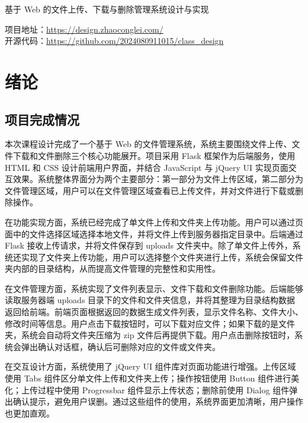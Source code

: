 \documentclass[UTF8,zihao=-4]{ctexrep}
\begin{document}


\begin{center}
    {\heiti{} 基于 Web 的文件上传、下载与删除管理系统设计与实现}

    \vspace{1cm}
    {
        项目地址：\href{https://design.zhaoconglei.com/}{https://design.zhaoconglei.com/} \\
        开源代码：\href{https://github.com/2024080911015/class\_design}{https://github.com/2024080911015/class\_design}
    }
\end{center}

\newpage

\tableofcontents
\newpage

\chapter{绪论}

\section{项目完成情况}

本次课程设计完成了一个基于 Web 的文件管理系统，系统主要围绕文件上传、文件下载和文件删除三个核心功能展开。项目采用 Flask 框架作为后端服务，使用 HTML 和 CSS 设计前端用户界面，并结合 JavaScript 与 jQuery UI 实现页面交互效果。系统整体界面分为两个主要部分：第一部分为文件上传区域，第二部分为文件管理区域，用户可以在文件管理区域查看已上传文件，并对文件进行下载或删除操作。

在功能实现方面，系统已经完成了单文件上传和文件夹上传功能。用户可以通过页面中的文件选择区域选择本地文件，并将文件上传到服务器指定目录中。后端通过 Flask 接收上传请求，并将文件保存到 uploads 文件夹中。除了单文件上传外，系统还实现了文件夹上传功能，用户可以选择整个文件夹进行上传，系统会保留文件夹内部的目录结构，从而提高文件管理的完整性和实用性。

在文件管理方面，系统实现了文件列表显示、文件下载和文件删除功能。后端能够读取服务器端 uploads 目录下的文件和文件夹信息，并将其整理为目录结构数据返回给前端。前端页面根据返回的数据生成文件列表，显示文件名称、文件大小、修改时间等信息。用户点击下载按钮时，可以下载对应文件；如果下载的是文件夹，系统会自动将文件夹压缩为 zip 文件后再提供下载。用户点击删除按钮时，系统会弹出确认对话框，确认后可删除对应的文件或文件夹。

在交互设计方面，系统使用了 jQuery UI 组件库对页面功能进行增强。上传区域使用 Tabs 组件区分单文件上传和文件夹上传；操作按钮使用 Button 组件进行美化；上传过程中使用 Progressbar 组件显示上传状态；删除前使用 Dialog 组件弹出确认提示，避免用户误删。通过这些组件的使用，系统界面更加清晰，用户操作也更加直观。
\end{document}
